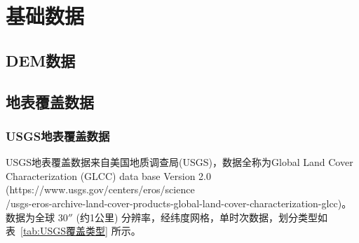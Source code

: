 \chapter{基础数据}\label{基础数据}


\section{DEM数据}

\section{地表覆盖数据}\label{地表覆盖数据}
\subsection{USGS地表覆盖数据}\label{USGS地表覆盖数据}
USGS地表覆盖数据来自美国地质调查局(USGS)，数据全称为Global Land Cover Characterization (GLCC) data base Version 2.0 
(https://www.usgs.gov/centers/eros/science\\/usgs-eros-archive-land-cover-products-global-land-cover-characterization-glcc)。
数据为全球 $30''$ (约1公里) 分辨率，经纬度网格，单时次数据，划分类型如表~\ref{tab:USGS覆盖类型} 所示。
